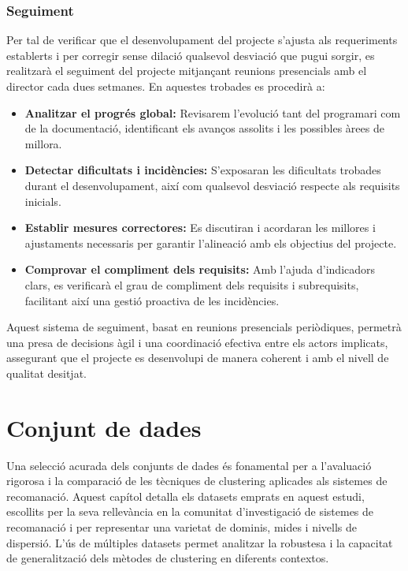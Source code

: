 \documentclass[a4paper,12pt]{report}
\begin{document}
\subsection{Seguiment}

Per tal de verificar que el desenvolupament del projecte s’ajusta als requeriments establerts i per corregir sense dilació qualsevol desviació que pugui sorgir, es realitzarà el seguiment del projecte mitjançant reunions presencials amb el director cada dues setmanes. En aquestes trobades es procedirà a:

\begin{itemize}
    \item \textbf{Analitzar el progrés global:} Revisarem l’evolució tant del programari com de la documentació, identificant els avanços assolits i les possibles àrees de millora.
    \item \textbf{Detectar dificultats i incidències:} S'exposaran les dificultats trobades durant el desenvolupament, així com qualsevol desviació respecte als requisits inicials.
    \item \textbf{Establir mesures correctores:} Es discutiran i acordaran les millores i ajustaments necessaris per garantir l'alineació amb els objectius del projecte.
    \item \textbf{Comprovar el compliment dels requisits:} Amb l’ajuda d’indicadors clars, es verificarà el grau de compliment dels requisits i subrequisits, facilitant així una gestió proactiva de les incidències.
\end{itemize}

Aquest sistema de seguiment, basat en reunions presencials periòdiques, permetrà una presa de decisions àgil i una coordinació efectiva entre els actors implicats, assegurant que el projecte es desenvolupi de manera coherent i amb el nivell de qualitat desitjat.

\chapter{Conjunt de dades}

Una selecció acurada dels conjunts de dades és fonamental per a l'avaluació rigorosa i la comparació de les tècniques de clustering aplicades als sistemes de recomanació.
Aquest capítol detalla els datasets emprats en aquest estudi, escollits per la seva rellevància en la comunitat d'investigació de sistemes de recomanació i per representar una varietat de dominis, mides i nivells de dispersió.
L'ús de múltiples datasets permet analitzar la robustesa i la capacitat de generalització dels mètodes de clustering en diferents contextos.
\end{document}
